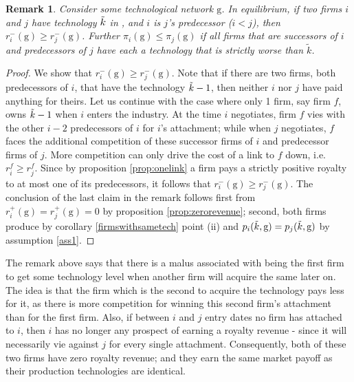 \documentclass{article}
\newtheorem{remark}{Remark}
\begin{document}
\begin{remark}
Consider some technological network $\text{g}$. In equilibrium, if two firms $i$ and $j$ have technology $\Tilde{k}$ in , and $i$ is $j$'s predecessor ($i<j$), then $r^-_i(\text{g})\geq r^-_j(\text{g})$. Further $\pi_i(\text{g})\leq \pi_j(\text{g})$ if all firms that are successors of $i$ and predecessors of $j$ have each a technology that is strictly worse than $\tilde{k}$.  
\end{remark}
\begin{proof}
We show that $r^{-}_i(\text{g})\geq r^{-}_j(\text{g})$. Note that if there are two firms, both predecessors of $i$, that have the technology $\Tilde{k}-1$, then neither $i$ nor $j$ have paid anything for theirs. Let us continue with the case where only 1 firm, say firm $f$, owns $\Tilde{k}-1$ when $i$ enters the industry. At the time $i$ negotiates, firm $f$ vies with the other $i-2$ predecessors of $i$ for $i$'s attachment; while when $j$ negotiates, $f$ faces the additional competition of these successor firms of $i$ and predecessor firms of $j$. More competition can only drive the cost of a link to $f$ down, i.e. $r^{f}_{i}\geq r^{f}_{j}$. Since by proposition \ref{prop:onelink} a firm pays a strictly positive royalty to at most one of its predecessors, it follows that $r^{-}_i(\text{g})\geq r^{-}_j(\text{g})$.
The conclusion of the last claim in the remark follows first from $r^{+}_i(\text{g})=r^{+}_j(\text{g})=0$ by proposition \ref{prop:zerorevenue}; second, both firms produce by corollary \ref{firmswithsametech} point (ii) and  $p_i(\Tilde{k},\text{g})=p_j(\Tilde{k},\text{g})$ by assumption \ref{ass1}. 
\end{proof}

The remark above says that there is a malus associated with being the first firm to get some technology level when another firm will acquire the same later on. The idea is that the firm which is the second to acquire the technology pays less for it, as there is more competition for winning this second firm's attachment than for the first firm. Also, if between $i$ and $j$ entry dates no firm has attached to $i$, then $i$ has no longer any prospect of earning a royalty revenue - since it will necessarily vie against $j$ for every single attachment. Consequently, both of these two firms have zero royalty revenue; and they earn the same market payoff as their production technologies are identical. \\
\end{document}
